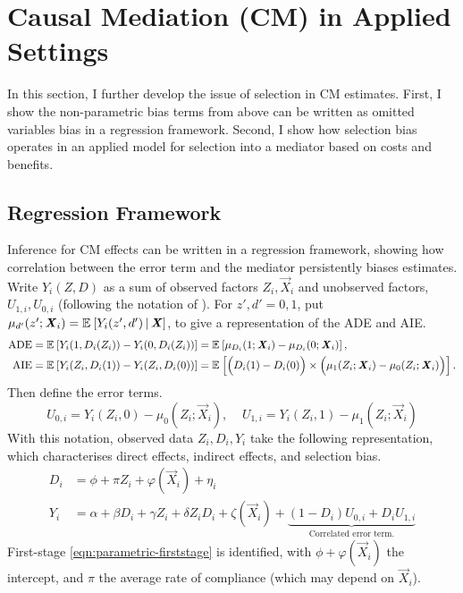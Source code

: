 \section{Causal Mediation (CM) in Applied Settings}
\label{sec:selection}
In this section, I further develop the issue of selection in CM estimates. First, I show the non-parametric bias terms from above can be written as omitted variables bias in a regression framework.
Second, I show how selection bias operates in an applied model for selection into a mediator based on costs and benefits.

\subsection{Regression Framework}
\label{sec:regression}
Inference for CM effects can be written in a regression framework, showing how correlation between the error term and the mediator persistently biases estimates.
Write $Y_i(Z, D)$ as a sum of observed factors $Z_i, \vec X_i$ and unobserved factors, $U_{1,i}, U_{0,i}$ (following the notation of \citealt{heckman2005structural}).
For $z',d' = 0,1$, put $\mu_{d'}(z'; \boldsymbol{\mathit{X}}_i) = \mathbb{E}_{} \left[ Y_i(z', d') \, \middle\vert \, \boldsymbol{\mathit{X}} \right]$, to give a representation of the ADE and AIE.
\begin{align*}
    \text{ADE}
    = \mathbb{E}_{} \left[ Y_i(1, D_i(Z_i)) - Y_i(0, D_i(Z_i)) \right]
    &= \mathbb{E}_{} \left[  \mu_{D_i}(1; \boldsymbol{\mathit{X}}_i) - \mu_{D_i}(0; \boldsymbol{\mathit{X}}_i) \right], \\
    \text{AIE}    
    = \mathbb{E}_{} \left[ Y_i(Z_i, D_i(1)) - Y_i(Z_i, D_i(0)) \right]
        &= \mathbb{E}_{} \left[ \Big( D_i(1) - D_i(0) \Big)
        \times \Big( \mu_1(Z_i; \boldsymbol{\mathit{X}}_i) - \mu_0(Z_i; \boldsymbol{\mathit{X}}_i) \Big)  \right].
\end{align*}
Then define the error terms.
\[ U_{0,i} = Y_i(Z_i, 0) - \mu_0(Z_i; \vec X_i),\;\;\;\;
U_{1,i} = Y_i(Z_i, 1) - \mu_1(Z_i; \vec X_i) \]
With this notation, observed data $Z_i, D_i, Y_i$ take the following representation, which characterises direct effects, indirect effects, and selection bias.
\begin{align}
    \label{eqn:parametric-firststage}
    D_i &= \phi + \pi Z_i + \varphi(\vec X_i) + \eta_i  \\
    \label{eqn:parametric-secondstage}
    Y_i &= \alpha + \beta D_i + \gamma Z_i + \delta Z_i D_i
    + \zeta(\vec X_i)
    + \underbrace{\left(1 - D_i \right)U_{0,i} + D_i U_{1,i}}_{
        \text{Correlated error term.}}
\end{align}
First-stage \eqref{eqn:parametric-firststage} is identified, with $\phi + \varphi(\vec X_i)$ the intercept, and $\pi$ the average rate of compliance (which may depend on $\vec X_i$).
